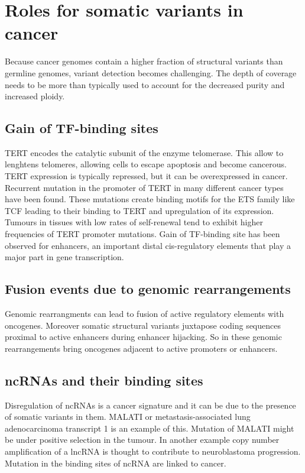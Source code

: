 \section{Roles for somatic variants in cancer}
Because cancer genomes contain a higher fraction of structural variants than germline genomes, variant detection becomes challenging.
The depth of coverage needs to be more than typically used to account for the decreased purity and increased ploidy.

	\subsection{Gain of TF-binding sites}
	TERT encodes the catalytic subunit of the enzyme telomerase.
	This allow to lenghtens telomeres, allowing cells to escape apoptosis and become cancerous.
	TERT expression is typically repressed, but it can be overexpressed in cancer.
	Recurrent mutation in the promoter of TERT in many different cancer types have been found.
	These mutations create binding motifs for the ETS family like TCF leading to their binding to TERT and upregulation of its expression.
	Tumours in tissues with low rates of self-renewal tend to exhibit higher frequencies of TERT promoter mutations.
	Gain of TF-binding site has been observed for enhancers, an important distal cis-regulatory elements that play a major part in gene transcription.

	\subsection{Fusion events due to genomic rearrangements}
	Genomic rearrangments can lead to fusion of active regulatory elements with oncogenes.
	Moreover somatic structural variants juxtapose coding sequences proximal to active enhancers during enhancer hijacking.
	So in these genomic rearrangements bring oncogenes adjacent to active promoters or enhancers.

	\subsection{ncRNAs and their binding sites}
	Disregulation of ncRNAs is a cancer signature and it can be due to the presence of somatic variants in them.
	MALATI or metastasis-associated lung adenocarcinoma transcript 1 is an example of this.
	Mutation of MALATI might be under positive selection in the tumour.
	In another example copy number amplification of a lncRNA is thought to contribute to neuroblastoma progression.
	Mutation in the binding sites of ncRNA are linked to cancer.

